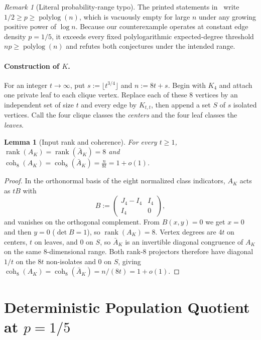 \documentclass[11pt]{article}
\theoremstyle{plain}
\newtheorem{lemma}[theorem]{Lemma}
\theoremstyle{definition}
\theoremstyle{remark}
\newtheorem{remark}{Remark}
\DeclareMathOperator{\coh}{coh}
\DeclareMathOperator{\rank}{rank}
\DeclareMathOperator{\polylog}{polylog}
\begin{document}
\begin{remark}[Literal probability-range typo]
The printed statements in~\cite{dOrsiNovikov2025} write $1/2 \ge p \ge \polylog(n)$, which is vacuously empty for large $n$ under any growing positive power of $\log n$. Because our counterexample operates at constant edge density $p = 1/5$, it exceeds every fixed polylogarithmic expected-degree threshold $np \ge \polylog(n)$ and refutes both conjectures under the intended range.
\end{remark}

\paragraph{Construction of $K$.}
For an integer $t \to \infty$, put $s := \lfloor t^{3/4} \rfloor$ and $n := 8t + s$. Begin with $K_4$ and attach one private leaf to each clique vertex. Replace each of these $8$ vertices by an independent set of size $t$ and every edge by $K_{t,t}$, then append a set $S$ of $s$ isolated vertices. Call the four clique classes the \emph{centers} and the four leaf classes the \emph{leaves}.

\begin{lemma}[Input rank and coherence]\label{lem:input}
For every $t \ge 1$, $\rank(A_K) = \rank(\bar{A}_K) = 8$ and $\coh_8(A_K) = \coh_8(\bar{A}_K) = \frac{n}{8t} = 1 + o(1)$.
\end{lemma}

\begin{proof}
In the orthonormal basis of the eight normalized class indicators, $A_K$ acts as $tB$ with
\[
B := \begin{pmatrix} J_4 - I_4 & I_4 \\ I_4 & 0 \end{pmatrix},
\]
and vanishes on the orthogonal complement. From $B(x, y) = 0$ we get $x = 0$ and then $y = 0$ ($\det B = 1$), so $\rank(A_K) = 8$. Vertex degrees are $4t$ on centers, $t$ on leaves, and $0$ on $S$, so $\bar{A}_K$ is an invertible diagonal congruence of $A_K$ on the same $8$-dimensional range. Both rank-$8$ projectors therefore have diagonal $1/t$ on the $8t$ non-isolates and $0$ on $S$, giving $\coh_8(A_K) = \coh_8(\bar{A}_K) = n/(8t) = 1 + o(1)$.
\end{proof}

\section{Deterministic Population Quotient at \texorpdfstring{$p = 1/5$}{p = 1/5}}
\end{document}
